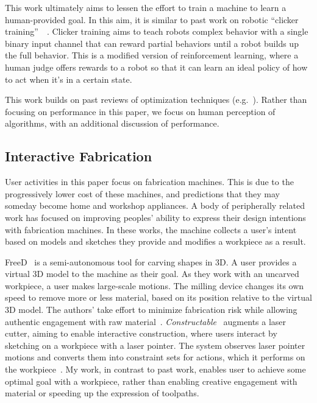 This work ultimately aims to lessen the effort to train a machine to learn a human-provided goal.
In this aim, it is similar to past work on robotic ``clicker training''~\cite{kaplan_robotic_2002}~\cite{grollman_dogged_2007}.
Clicker training aims to teach robots complex behavior with a single binary input channel that can reward partial behaviors until a robot builds up the full behavior.
This is a modified version of reinforcement learning, where a human judge offers rewards to a robot so that it can learn an ideal policy of how to act when it's in a certain state.

This work builds on past reviews of optimization techniques (e.g.~\cite{hansen_comparing_2010,mersmann_benchmarking_2010}).
Rather than focusing on performance in this paper, we focus on human perception of algorithms, with an additional discussion of performance.

\subsection{Interactive Fabrication}

User activities in this paper focus on fabrication machines.
This is due to the progressively lower cost of these machines, and predictions that they may someday become home and workshop appliances.
A body of peripherally related work has focused on improving peoples' ability to express their design intentions with fabrication machines.
In these works, the machine collects a user's intent based on models and sketches they provide and modifies a workpiece as a result.

FreeD~\cite{zoran_human-computer_2013,zoran_hybrid_2014} is a semi-autonomous tool for carving shapes in 3D.
A user provides a virtual 3D model to the machine as their goal.
As they work with an uncarved workpiece, a user makes large-scale motions.
The milling device changes its own speed to remove more or less material, based on its position relative to the virtual 3D model.
The authors' take effort to minimize fabrication risk while allowing authentic engagement with raw material~\cite{zoran_hybrid_2014}.
\emph{Constructable}~\cite{mueller_interactive_2012} augments a laser cutter, aiming to enable interactive construction, where users interact by sketching on a workpiece with a laser pointer.
The system observes laser pointer motions and converts them into constraint sets for actions, which it performs on the workpiece~\cite{mueller_interactive_2012,mueller_laserorigami_2013}.
My work, in contrast to past work, enables user to achieve some optimal goal with a workpiece, rather than enabling creative engagement with material or speeding up the expression of toolpaths.

